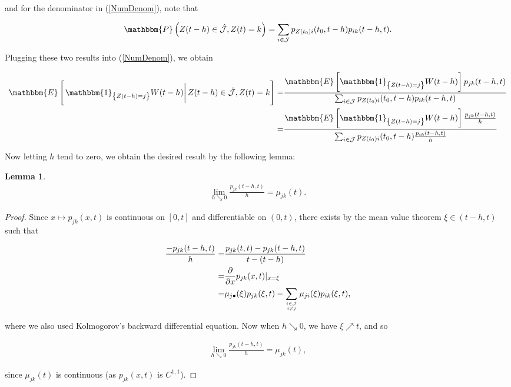 \documentclass{book}
\newcommand{\1}[1]{\mathbbm{1}_{\left\lbrace #1 \right\rbrace}}
\newcommand{\expec}[1][def]{\mathbbm{E} \left[ #1 \right]}
\newcommand{\econd}[2][def]{\mathbbm{E} \left[ \left. #1 \right| #2 \right]}
\newcommand{\probability}[1][def]{\mathbbm{P} \left( #1 \right)}
\theoremstyle{break}
\newtheorem{lemma}[definition]{Lemma}
\theoremstyle{remark}
\numberwithin{equation}{section}
\begin{document}
and for the denominator in (\ref{NumDenom}), note that 


\begin{align*}
	\probability[Z(t-h) \in \hat{\mathcal{J}}, Z(t)=k] = \sum_{i \in \mathcal{J}} p_{Z(t_0)i}(t_0,t-h) p_{ik}(t-h,t).
\end{align*}

Plugging these two results into (\ref{NumDenom}), we obtain

\begin{align*}
	\econd[\1{Z(t-h)=j} W(t-h)]{Z(t-h) \in \hat{\mathcal{J}}, Z(t) = k} =& \frac{\expec[\1{Z(t-h)=j} W(t-h)] p_{jk}(t-h,t)}{\sum_{i \in \mathcal{J}} p_{Z(t_0)i}(t_0,t-h) p_{ik}(t-h,t)} \\
	=& \frac{\expec[\1{Z(t-h)=j} W(t-h)] \frac{p_{jk}(t-h,t)}{h}}{\sum_{i \in \mathcal{J}} p_{Z(t_0)i}(t_0,t-h) \frac{p_{ik}(t-h,t)}{h}} \\
\end{align*}

Now letting $h$ tend to zero, we obtain the desired result by the following lemma:

\begin{lemma}
	\begin{align*}
		\lim_{h \searrow 0} \frac{p_{jk}(t-h,t)}{h} = \mu_{jk}(t).
	\end{align*}
\end{lemma}
\begin{proof}
	Since $x \mapsto p_{jk}(x,t)$ is continuous on $[0,t]$ and differentiable on $(0,t)$, there exists by the mean value theorem $\xi \in ( t-h, t)$ such that
	
	\begin{align*}
		\frac{-p_{jk}(t-h,t)}{h} =& \frac{p_{jk}(t,t)-p_{jk}(t-h,t)}{t-(t-h)} \\
		=& \frac{\partial}{\partial x} p_{jk}(x,t)|_{x=\xi} \\
		=& \mu_{j \bullet}(\xi) p_{jk}(\xi,t) - \sum_{i \in \mathcal{J} \atop i \neq j} \mu_{ji}(\xi) p_{ik}(\xi,t),
	\end{align*}
	
	where we also used Kolmogorov's backward differential equation. Now when $h \searrow 0$, we have $\xi \nearrow t$, and so
	
	\begin{align*}
		\lim_{h \searrow 0} \frac{p_{jk}(t-h,t)}{h} = \mu_{jk}(t),
	\end{align*}
	
	since $\mu_{jk}(t)$ is continuous (as $p_{jk}(x,t)$ is $C^{1,1}$).
\end{proof}
\end{document}

